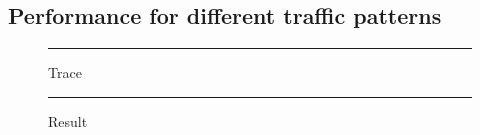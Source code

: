 \documentclass[12pt]{article}
\theoremstyle{definition}
\begin{document}
\subsection{Performance for different traffic patterns}
\begin{figure}[htb]
  \centering
  \begin{subfigure} {\texttt{[image: trace\_bodytrack.png]}} \end{subfigure}
  \begin{subfigure} {\texttt{[image: trace\_canneal.png]}} \end{subfigure}
  \begin{subfigure} {\texttt{[image: trace\_dedup.png]}} \end{subfigure}
  \begin{subfigure} {\texttt{[image: trace\_fluidanimate.png]}} \end{subfigure}
  \begin{subfigure} {\texttt{[image: trace\_freqmine.png]}} \end{subfigure}
  \begin{subfigure} {\texttt{[image: trace\_swaption.png]}} \end{subfigure}
  \rule{\linewidth}{1pt}
  \caption{Trace}
  \label{fig:trace}
\end{figure}
\begin{figure}[htb]
  \centering
  \begin{subfigure} {\texttt{[image: result\_bodytrack.png]}} \end{subfigure}
  \begin{subfigure} {\texttt{[image: result\_canneal.png]}} \end{subfigure}
  \begin{subfigure} {\texttt{[image: result\_dedup.png]}} \end{subfigure}
  \begin{subfigure} {\texttt{[image: result\_fluidanimate.png]}} \end{subfigure}
  \begin{subfigure} {\texttt{[image: result\_freqmine.png]}} \end{subfigure}
  \begin{subfigure} {\texttt{[image: result\_swaption.png]}} \end{subfigure}
  \rule{\linewidth}{1pt}
  \caption{Result}
  \label{fig:result}
\end{figure}
\end{document}
